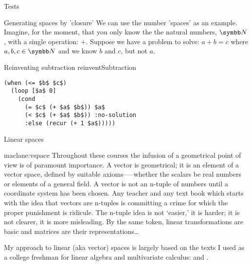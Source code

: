 \documentclass{PalisadesLakesArticle}
\begin{document}
\begin{plSection}{Tests}
\begin{plSection}{Generating spaces by 'closure'}
We can use the number 'spaces' as an example.
Imagine, for the moment, that you only know the 
the natural numbers, $\Space{N}$, 
with a single operation: $+$.
Suppose we have a problem to solve:
\begin{math}
a + b = c
\end{math}
where $a,b,c\in \Space{N}$ 
and we know $b$ and $c$,
but not $a$.

\begin{plListing}
[breakable=false]
{Reinventing subtraction}
{reinventSubtraction}
\begin{lstlisting}
(when (<= $b$ $c$)
  (loop [$a$ 0]
    (cond 
      (= $c$ (+ $a$ $b$)) $a$
      (< $c$ (+ $a$ $b$)) :no-solution
      :else (recur (+ 1 $a$)))))
\end{lstlisting}
\end{plListing}

\end{plSection}%
\begin{plSection}{Linear spaces}
\label{sec:Linear-spaces}

\begin{plQuote}
{}
{maclane:vspace}
{Throughout these courses the infusion of a geometrical
point of view is of paramount importance. A vector
is geometrical; it is an element of a vector space, defined
by suitable axioms—--whether the scalars be real numbers or
elements of a general field. A vector is not an n-tuple of
numbers until a coordinate system has been chosen. Any
teacher and any text book which starts with the idea that vectors
are n-tuples is committing a crime for which the proper
punishment is ridicule. The n-tuple idea is not ‘easier,’ it is
harder; it is not clearer, it is more misleading. By the same
token, linear transformations are basic and matrices are their
representations\ldots}
\end{plQuote}

My approach to linear (aka vector) spaces is largely based on
the texts I used as a college freshman for linear algebra and
multivariate calculus: 
and .


\end{plSection}
\end{plSection}
\end{document}
